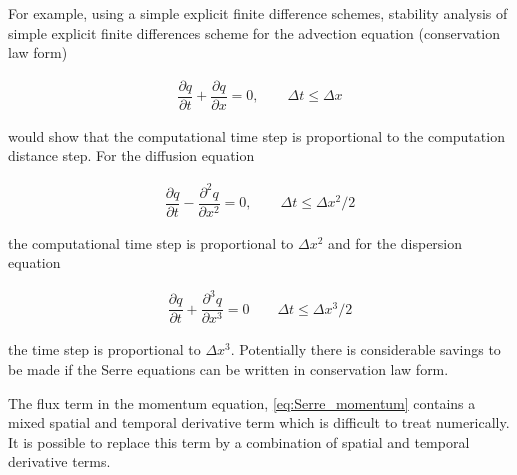 \documentclass[SingleSpace,12pt]{Serre_ASCE}
\begin{document}
For example, using a simple explicit finite difference schemes, stability analysis of simple explicit finite differences scheme for the advection equation (conservation law form)
\begin{linenomath*}
\begin{gather*}
\dfrac{\partial q}{\partial t} + \dfrac{\partial q}{\partial x} = 0,  \qquad \Delta t \le \Delta x
\end{gather*}
\end{linenomath*}
would show that the computational time step is proportional to the computation distance step. For the diffusion equation
\begin{linenomath*}
\begin{gather*}
\dfrac{\partial q}{\partial t} - \dfrac{\partial^2 q}{\partial x^2} = 0, \qquad \Delta t \le \Delta x^2/2
\end{gather*}
\end{linenomath*}
the computational time step is proportional to $\Delta x^2$ and for the dispersion equation
\begin{linenomath*}
\begin{gather*}
\dfrac{\partial q}{\partial t} + \dfrac{\partial^3 q}{\partial x^3} = 0 \qquad \Delta t \le \Delta x^3/2
\end{gather*}
\end{linenomath*}
the time step is proportional to $\Delta x^3$. Potentially there is considerable savings to be made if the Serre equations can be written in conservation law form.

The flux term in the momentum equation, \eqref{eq:Serre_momentum} contains a mixed spatial and temporal derivative term which is difficult to treat numerically. It is possible to replace this term by a combination of spatial and temporal derivative terms.
\end{document}

